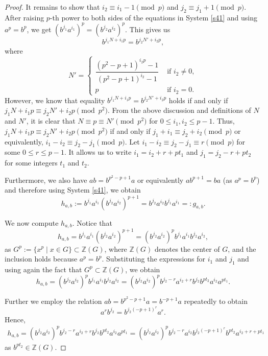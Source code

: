 \documentclass[11pt]{amsart}
\theoremstyle{plain}
\numberwithin{equation}{section}
\begin{document}
\begin{proof}
It remains to show that $i_2\equiv i_1-1 \pmod  p$ and $j_2 \equiv j_1+1 \pmod  p$. After raising $p$-th power to both sides of the equations in System \eqref{s41} and using $a^p=b^p$, we get $(b^{j_1}a^{i_1})^p=(b^{j_2}a^{i_2})^p$. This gives us  
\[
b^{j_1N+i_1p}=b^{j_2N'+i_2p},
\]
where $$
N'=\begin{cases} \dfrac{(p^2-p+1)^{i_2p}-1}{(p^2-p+1)^{i_2}-1} & \text{ if } i_2 \neq 0,\\p 
 & \text{ if } i_2=0.\end{cases}$$
  However, we know that equality $b^{j_1N+i_1p}=b^{j_2N'+i_2p}$ holds if and only if  $j_1N+i_1p \equiv j_2N'+i_2p \pmod {p^2}$.
 From the above discussion and definitions of $N$ and $N'$, it is clear that $N \equiv p \equiv N' \pmod {p^2}$ for $0 \leq i_1,i_2 \leq p-1$. Thus,  $j_1N+i_1p \equiv j_2N'+i_2p \pmod {p^2}$ if and only if $j_1+i_1 \equiv j_2+i_2 \pmod p$ or equivalently, $i_1-i_2 \equiv j_2-j_1 \pmod p$. Let $i_1-i_2 \equiv j_2-j_1 \equiv r \pmod p$ for some $0 \leq r \leq p-1$. It allows us to write $i_1=i_2+r+pt_1$ and $j_1=j_2-r+pt_2$ for some integers $t_1$ and $t_2$.
 
 Furthermore, we also have $ab=b^{p^2-p+1}a$ or equivalently $ab^{p+1}=ba$ (as $a^p=b^p$) and therefore using System \eqref{s41}, we obtain    
 \begin{equation}\label{e43}
 h_{a,b}:=b^{j_1}a^{i_1}(b^{j_2}a^{i_2})^{p+1}=b^{j_2}a^{i_2}b^{j_1}a^{i_1}=:g_{a,b}.
 \end{equation}

We now compute $h_{a,b}$.
Notice that 
\[
h_{a,b} = b^{j_1}a^{i_1}(b^{j_2}a^{i_2})^{p+1} 
= (b^{j_2}a^{i_2})^{p} b^{j_1}a^{i_1}b^{j_2}a^{i_2},
\]
as $G^{p} := \{x^{p} \mid x \in G\} \subset \mathbb{Z}(G)$,
where $ \mathbb{Z}(G) $ denotes the center of $ G $, 
and the inclusion holds because $a^{p} = b^{p}$. Substituting the expressions for $ i_1$ and $ j_1 $ and using again the fact that $G^{p} \subset \mathbb{Z}(G) $, we obtain  
\[
h_{a,b}=(b^{j_2}a^{i_2})^{p} b^{j_1}a^{i_1}b^{j_2}a^{i_2}
= (b^{j_2}a^{i_2})^{p}b^{j_2-r}a^{i_2+r}b^{j_2}b^{pt_2}a^{i_2}a^{pt_1}.
\]

Further we employ the relation $ab=b^{p^2-p+1}a=b^{-p+1}a$ repeatedly to obtain $$a^rb^{j_2}=b^{j_2(-p+1)^{r}}a^r.$$Hence, 
\begin{equation*}
\begin{split}
h_{a,b}= (b^{j_2}a^{i_2})^{p}b^{j_2-r}a^{i_2+r}b^{j_2}b^{pt_2}a^{i_2}a^{pt_1}={(b^{j_2}a^{i_2})^{p}b^{j_2-r}a^{i_2}b^{j_2(-p+1)^{r}}b^{pt_2}a^{i_2+r+pt_1}}
\end{split}
\end{equation*}
as $b^{pt_2}\in \mathbb{Z}(G)$.


\end{proof}
\end{document}
